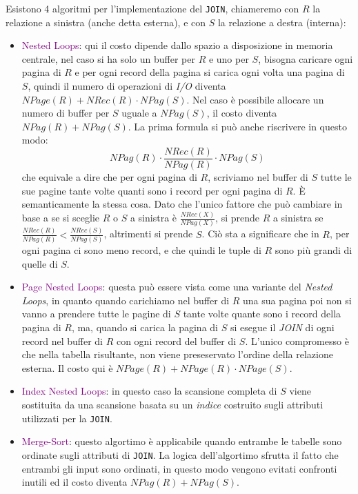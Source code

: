 Esistono 4 algoritmi per l'implementazione del \verb|JOIN|, chiameremo con $R$ la relazione a sinistra
(anche detta esterna), e con $S$ la relazione a destra (interna):
\begin{itemize}
    \item \textcolor{purple}{Nested Loops}: qui il costo dipende dallo spazio
        a disposizione in memoria centrale, nel caso si ha solo un buffer per $R$ e uno
        per $S$, bisogna caricare ogni pagina di $R$ e per ogni record della pagina
        si carica ogni volta una pagina di $S$, quindi il numero di operazioni di \emph{I/O}
        diventa $NPage(R) + NRec(R) \cdot NPag(S)$. Nel caso è possibile allocare
        un numero di buffer per $S$ uguale a $NPag(S)$, il costo diventa $NPag(R) + NPag(S)$.
        La prima formula si può anche riscrivere in questo modo:
        \begin{equation*}
            NPag(R) \cdot \frac{NRec(R)}{NPag(R)} \cdot NPag(S)
        \end{equation*}
        che equivale a dire che per ogni pagina di $R$, scriviamo nel
        buffer di $S$ tutte le sue pagine tante volte quanti sono i record
        per ogni pagina di $R$. È semanticamente la stessa cosa.
        Dato che l'unico fattore che può cambiare in base a se si sceglie
        $R$ o $S$ a sinistra è $\frac{NRec(X)}{NPag(X)}$, si prende $R$
        a sinistra se $\frac{NRec(R)}{NPag(R)} < \frac{NRec(S)}{NPag(S)}$,
        altrimenti si prende $S$. Ciò sta a significare che in $R$, per ogni pagina
        ci sono meno record, e che quindi le tuple di $R$ sono più grandi di quelle di
        $S$.
    \item \textcolor{purple}{Page Nested Loops}: questa può essere vista come una
        variante del \emph{Nested Loops}, in quanto quando carichiamo nel buffer di $R$
        una sua pagina poi non si vanno a prendere tutte le pagine di $S$ tante volte
        quante sono i record della pagina di $R$, ma, quando si carica la pagina di $S$
        si esegue il \emph{JOIN} di ogni record nel buffer di $R$ con ogni record del buffer
        di $S$. L'unico compromesso è che nella tabella risultante, non viene
        preseservato l'ordine della relazione esterna. Il costo qui è $NPage(R) + NPage(R) \cdot NPage(S)$.
    \item \textcolor{purple}{Index Nested Loops}: in questo caso la scansione completa di $S$ viene
        sostituita da una scansione basata su un \emph{indice} costruito sugli attributi utilizzati per la \verb|JOIN|.
    \item \textcolor{purple}{Merge-Sort}: questo algortimo è applicabile quando entrambe le tabelle
        sono ordinate sugli attributi di \verb|JOIN|. La logica dell'algortimo sfrutta il fatto che entrambi
        gli input sono ordinati, in questo modo vengono evitati confronti inutili ed il costo diventa
        $NPag(R) + NPag(S)$.
\end{itemize}

